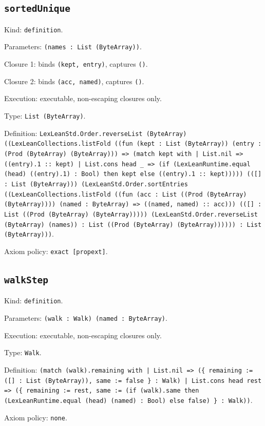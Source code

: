 \documentclass[11pt]{article}
\begin{document}
\subsection*{\texttt{sortedUnique}}
\noindent Kind: \texttt{definition}.\par
\noindent Parameters: \texttt{(names : List (ByteArray))}.\par
\noindent Closure 1: binds \texttt{(kept, entry)}, captures \texttt{()}.\par
\noindent Closure 2: binds \texttt{(acc, named)}, captures \texttt{()}.\par
\noindent Execution: executable, non-escaping closures only.\par
\noindent Type: \texttt{List (ByteArray)}.\par
\noindent Definition: \texttt{LexLeanStd.Order.reverseList (ByteArray) ((LexLeanCollections.listFold ((fun (kept : List (ByteArray)) (entry : (Prod (ByteArray) (ByteArray))) => (match kept with | List.nil => ((entry).1 :: kept) | List.cons head \_ => (if (LexLeanRuntime.equal (head) ((entry).1) : Bool) then kept else ((entry).1 :: kept))))) (([] : List (ByteArray))) (LexLeanStd.Order.sortEntries ((LexLeanCollections.listFold ((fun (acc : List ((Prod (ByteArray) (ByteArray)))) (named : ByteArray) => ((named, named) :: acc))) (([] : List ((Prod (ByteArray) (ByteArray))))) (LexLeanStd.Order.reverseList (ByteArray) (names)) : List ((Prod (ByteArray) (ByteArray)))))) : List (ByteArray)))}.\par
\noindent Axiom policy: \texttt{exact [propext]}.\par
\subsection*{\texttt{walkStep}}
\noindent Kind: \texttt{definition}.\par
\noindent Parameters: \texttt{(walk : Walk) (named : ByteArray)}.\par
\noindent Execution: executable, non-escaping closures only.\par
\noindent Type: \texttt{Walk}.\par
\noindent Definition: \texttt{(match (walk).remaining with | List.nil => (\{ remaining := ([] : List (ByteArray)), same := false \} : Walk) | List.cons head rest => (\{ remaining := rest, same := (if (walk).same then (LexLeanRuntime.equal (head) (named) : Bool) else false) \} : Walk))}.\par
\noindent Axiom policy: \texttt{none}.\par
\end{document}
